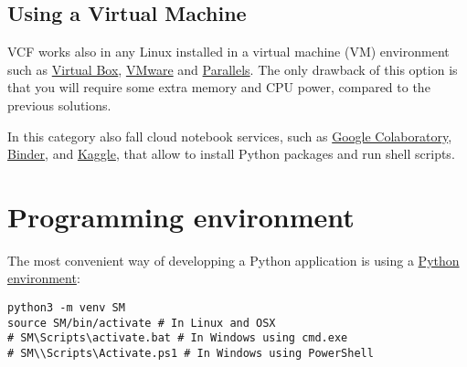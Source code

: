 \subsection{Using a Virtual Machine}
VCF works also in any Linux installed in a virtual machine (VM)
environment such as \href{https://www.virtualbox.org/}{Virtual Box},
\href{https://www.vmware.com/}{VMware} and \href{https://www.vmware.com/}{Parallels}.
The only drawback of this option is that you will require
some extra memory and CPU power, compared to the previous solutions.

In this category also fall cloud notebook services, such as
\href{https://colab.research.google.com/}{Google Colaboratory},
\href{https://mybinder.org/}{Binder}, and
\href{https://www.kaggle.com/}{Kaggle}, that allow to install Python
packages and run shell scripts.

\begin{comment}
\subsection{Running CVF in a ``Notebook''}
VCF modules can be invoked from \href{https://jupyter.org/}{Jupyter}
notebooks and similar environments, such as
\href{https://colab.research.google.com/}{Google Colaboratory} and
\href{https://mybinder.org/}{Binder}. Notice, however, that in these
cases, you will probably need to configure your notebooks to install
all the necessary stuff from scratch.

\section{About the Programming Language(s)}

VCF is fully written in
\href{https://www.python.org/}{Python}~\cite{vruiz__YAPT}. You will
also need to interact with a
\href{https://en.wikipedia.org/wiki/Command-line_interface}{commands
  line terminal}. It is recommended to use
\href{https://docs.python.org/3/library/venv.html}{virtual
  environments}.
\end{comment}

\section{Programming environment}

The most convenient way of developping a Python application is using a
\href{https://docs.python.org/3/library/venv.html}{Python environment}:
\begin{verbatim}
python3 -m venv SM
source SM/bin/activate # In Linux and OSX
# SM\Scripts\activate.bat # In Windows using cmd.exe
# SM\\Scripts\Activate.ps1 # In Windows using PowerShell
\end{verbatim}

